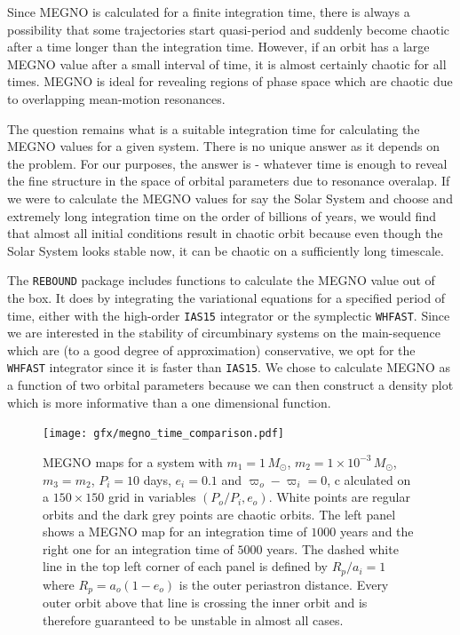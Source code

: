 \documentclass[ twoside,openright,titlepage,numbers=noenddot,headinclude,%
                footinclude=true,cleardoublepage=empty,abstractoff, %
                BCOR=5mm,paper=a4,fontsize=11pt,%
                american,%
                ]{scrreprt}
\begin{document}
Since MEGNO is calculated for a finite integration
time, there
is always a possibility that some trajectories start quasi-period and suddenly
become chaotic after a time longer than the integration time. However, if an orbit
has a large MEGNO value after a small interval of time, it 
is almost certainly chaotic for all times. MEGNO is ideal for revealing 
regions of phase space which are chaotic due to overlapping mean-motion resonances.

The question remains what is a suitable integration time for calculating the 
MEGNO values for a given system. There is no unique answer as it depends on 
the problem. For our purposes, the answer is  - whatever time is enough 
to reveal the fine structure in the space of orbital parameters 
due to resonance overalap. If we were to calculate the MEGNO values
for say the Solar System and choose and extremely long integration time
on the order of billions of years, we would find that almost all initial
conditions result in chaotic orbit because even though the Solar System looks
stable now, it can be chaotic on a sufficiently long timescale.

The \texttt{REBOUND} package includes functions to calculate
the MEGNO value out of the box. It does by integrating the variational equations
for a specified period of time, either with the high-order \texttt{IAS15} 
integrator or the symplectic \texttt{WHFAST}. Since we are interested
in the stability of circumbinary systems on the main-sequence which are
(to a good degree of approximation) conservative, we opt for the 
\texttt{WHFAST} integrator since it is faster than \texttt{IAS15}. We chose
to calculate MEGNO as a function of two orbital parameters because we can 
then construct a density plot which is more informative than a one 
dimensional function.
\begin{figure}[htb]
\centering
\texttt{[image: gfx/megno\_time\_comparison.pdf]}
\caption{MEGNO maps for a system with 
    $m_1=1\,M_\odot$, $m_2=1\times 10^{-3}\,M_\odot$, $m_3=m_2$,
    $P_i=10$ days, $e_i=0.1$ and $\varpi_o-\varpi_i=0$, c
    alculated on a $150\times 150$
    grid in variables $(P_o/P_i,e_o)$. White points are regular orbits
    and the dark grey points are chaotic orbits. The left panel
    shows a MEGNO map for an integration time of $1000$ years and the
    right one for an integration time of $5000$ years. The dashed white line in
    the top left corner of each panel is defined 
    by $R_p/a_i=1$ where $R_p=a_o(1-e_o)$
    is the outer periastron distance. Every outer orbit above that line
    is crossing the inner orbit and is therefore guaranteed to be 
    unstable in almost all cases.}
\label{fig:megno_example}
\end{figure}
\end{document}

